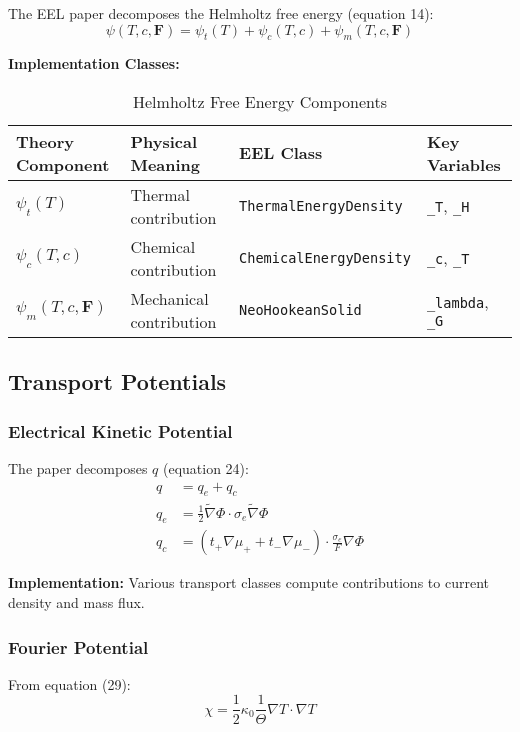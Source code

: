 \documentclass[11pt,a4paper]{article}
\begin{document}
The EEL paper decomposes the Helmholtz free energy (equation 14):
\begin{equation}
\psi(T,c,\mathbf{F}) = \psi_t(T) + \psi_c(T,c) + \psi_m(T,c,\mathbf{F})
\end{equation}

\textbf{Implementation Classes:}
\begin{table}[H]
\centering
\caption{Helmholtz Free Energy Components}
\begin{tabular}{@{}llll@{}}
\toprule
\textbf{Theory Component} & \textbf{Physical Meaning} & \textbf{EEL Class} & \textbf{Key Variables} \\
\midrule
$\psi_t(T)$ & Thermal contribution & \texttt{ThermalEnergyDensity} & \texttt{\_T}, \texttt{\_H} \\
$\psi_c(T,c)$ & Chemical contribution & \texttt{ChemicalEnergyDensity} & \texttt{\_c}, \texttt{\_T} \\
$\psi_m(T,c,\mathbf{F})$ & Mechanical contribution & \texttt{NeoHookeanSolid} & \texttt{\_lambda}, \texttt{\_G} \\
\bottomrule
\end{tabular}
\end{table}

\subsection{Transport Potentials}

\subsubsection{Electrical Kinetic Potential}
The paper decomposes $q$ (equation 24):
\begin{align}
q &= q_e + q_c \\
q_e &= \frac{1}{2}\tilde{\nabla}\Phi \cdot \sigma_e \tilde{\nabla}\Phi \\
q_c &= (t_+ \nabla\mu_+ + t_- \nabla\mu_-) \cdot \frac{\sigma_e}{F} \nabla\Phi
\end{align}

\textbf{Implementation:} Various transport classes compute contributions to current density and mass flux.

\subsubsection{Fourier Potential}
From equation (29):
\begin{equation}
\chi = \frac{1}{2}\kappa_0 \frac{1}{\Theta}\nabla T \cdot \nabla T
\end{equation}
\end{document}
